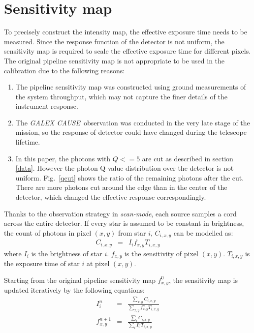 \documentclass[12pt, preprint]{aastex}
\newcommand{\project}[1]{\textsl{#1}}
\newcommand{\cause}{\project{GALEX CAUSE}}
\newcommand{\scanmode}{\project{scan-mode}}
\begin{document}
\section{Sensitivity map}
\label{sm}
To precisely construct the intensity map, the effective exposure time needs to be measured. 
Since the response function of the detector is not uniform, the sensitivity map is required to scale the effective exposure time for different pixels.
The original pipeline sensitivity map is not appropriate to be used in the calibration due to the following reasons:
\begin{enumerate}
\item The pipeline sensitivity map was constructed using ground measurements of the system throughput, which may not capture the finer details of the instrument response.
\item The \cause\ observation was conducted in the very late stage of the mission, so the response of detector could have changed during the telescope lifetime.
\item In this paper, the photons with $Q<=5$ are cut as described in section \ref{data}. 
However the photon Q value distribution over the detector is not uniform.
Fig.~\ref{qcut} shows the ratio of the remaining photons after the cut.
There are more photons cut around the edge than in the center of the detector, which changed the effective response correspondingly.
\end{enumerate}

Thanks to the observation strategy in \scanmode, each source samples a cord across the entire detector. 
If every star is assumed to be constant in brightness, the count of photons in pixel $(x,y)$ from star $i$, $C_{i,x,y}$ can be modelled as:
\begin{eqnarray}
C_{i,x,y} &=& I_{i}f_{x,y}T_{i,x,y}
\end{eqnarray}
where $I_{i}$ is the brightness of star $i$. 
$f_{x,y}$ is the sensitivity of pixel $(x,y)$.
$T_{i,x,y}$ is the exposure time of star $i$ at pixel $(x,y)$.

Starting from the original pipeline sensitivity map $f_{x,y}^{0}$, the sensitivity map is updated iteratively by the following equations:
\begin{eqnarray}
I_{i}^{n} &=& \frac{\sum_{x,y}C_{i,x,y}}{\sum_{x,y} f_{x,y}^{n} T_{i,x,y}} \\
f_{x,y}^{n+1} &=& \frac{\sum_{i}C_{i,x,y}}{\sum_{i} I_{i}^{n} T_{i,x,y}}
\end{eqnarray}
\end{document}
